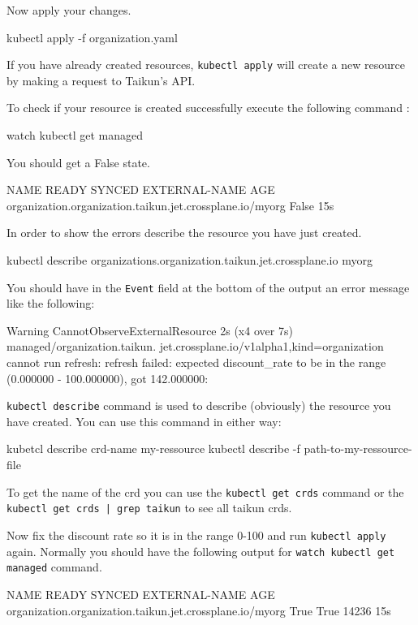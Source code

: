 Now apply your changes.

\begin{shell}
kubectl apply -f organization.yaml
\end{shell}
\begin{tip}
If you have already created resources, \texttt{kubectl apply} will create a new resource
by making a request to Taikun's API.
\end{tip}


To check if your resource is created successfully execute the following command :
\begin{shell}
watch kubectl get managed
\end{shell}

You should get a False state.
\begin{raw}
NAME                                                      READY SYNCED EXTERNAL-NAME AGE
organization.organization.taikun.jet.crossplane.io/myorg        False                15s
\end{raw}
In order to show the errors describe the resource you have just created.
\begin{shell}
kubectl describe organizations.organization.taikun.jet.crossplane.io myorg
\end{shell}

You should have in the \texttt{Event} field at the bottom of the output an error message like the following:
\begin{raw}
Warning  CannotObserveExternalResource  2s (x4 over 7s)  managed/organization.taikun.
jet.crossplane.io/v1alpha1,kind=organization  cannot run refresh: 
refresh failed: expected discount_rate to be in the range (0.000000 - 100.000000),
got 142.000000:
\end{raw}

\begin{tip}
\texttt{kubectl describe} command is used to describe (obviously) the resource you have created. You can use this command in either way:
\begin{shell}
kubetcl describe crd-name my-ressource
kubectl describe -f path-to-my-ressource-file
\end{shell}
To get the name of the crd you can use the \texttt{kubectl get crds} command or the \texttt{kubectl get crds | grep taikun} to see all taikun crds.
\end{tip}

Now fix the discount rate so it is in the range 0-100 and run \texttt{kubectl apply} again.
Normally you should have the following output for \texttt{watch kubectl get managed} command.
\begin{raw}
NAME                                                      READY SYNCED EXTERNAL-NAME AGE
organization.organization.taikun.jet.crossplane.io/myorg  True  True   14236         15s
\end{raw}


